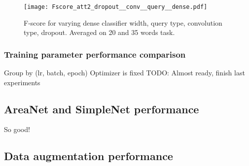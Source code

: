 \begin{figure*}[t!]
    \centering
    \texttt{[image: Fscore\_att2\_dropout\_\_conv\_\_query\_\_dense.pdf]}
    \caption{F-score for varying
        dense classifier width,
        query type,
        convolution type,
        dropout.
        Averaged on 20 and 35 words task.
        }%
    \label{fig:dropout_conv_query_dense}
\end{figure*}

\subsubsection{Training parameter performance comparison}

Group by (lr, batch, epoch)
Optimizer is fixed
TODO: Almost ready, finish last experiments

\subsection{AreaNet and SimpleNet performance}

So good!

\subsection{Data augmentation performance}


